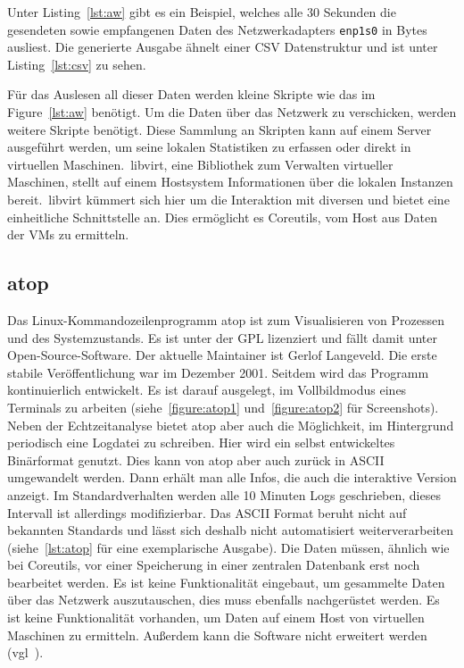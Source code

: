 Unter Listing~\ref{lst:aw} gibt es ein Beispiel, welches alle 30 Sekunden die
gesendeten sowie empfangenen Daten des Netzwerkadapters \texttt{enp1s0} in
Bytes ausliest. Die generierte Ausgabe ähnelt einer \gls{CSV} Datenstruktur und
ist unter Listing~\ref{lst:csv} zu sehen.

Für das Auslesen all dieser Daten werden kleine Skripte wie das im
Figure~\ref{lst:aw} benötigt. Um die Daten über das Netzwerk zu verschicken,
werden weitere Skripte benötigt. Diese Sammlung an Skripten kann auf einem
Server ausgeführt werden, um seine lokalen Statistiken zu erfassen oder direkt
in virtuellen Maschinen.\ libvirt, eine Bibliothek zum Verwalten virtueller
Maschinen, stellt auf einem Hostsystem Informationen über die lokalen Instanzen
bereit.\ libvirt kümmert sich hier um die Interaktion mit
diversen  und bietet eine einheitliche
Schnittstelle an. Dies ermöglicht es Coreutils, vom Host aus Daten der VMs zu
ermitteln.
\tm%

\subsection{atop}
Das Linux\hyp{}Kommandozeilenprogramm atop ist zum Visualisieren von Prozessen
und des Systemzustands. Es ist unter der GPL lizenziert und fällt damit unter
Open\hyp{}Source\hyp{}Software. Der aktuelle \gls{Maintainer} ist Gerlof
Langeveld. Die erste stabile Veröffentlichung war im Dezember 2001. Seitdem
wird das Programm kontinuierlich entwickelt. Es ist darauf ausgelegt, im
Vollbildmodus eines Terminals zu arbeiten (siehe~\ref{figure:atop1}
und~\ref{figure:atop2} für Screenshots). Neben der Echtzeitanalyse bietet atop
aber auch die Möglichkeit, im Hintergrund periodisch eine Logdatei zu
schreiben. Hier wird ein selbst entwickeltes Binärformat genutzt. Dies kann von
atop aber auch zurück in ASCII umgewandelt werden. Dann erhält man alle Infos,
die auch die interaktive Version anzeigt. Im Standardverhalten werden alle 10
Minuten Logs geschrieben, dieses Intervall ist allerdings modifizierbar. Das
ASCII Format beruht nicht auf bekannten Standards und lässt sich deshalb nicht
automatisiert weiterverarbeiten (siehe~\ref{lst:atop} für eine exemplarische
Ausgabe). Die Daten müssen, ähnlich wie bei Coreutils, vor einer Speicherung in
einer zentralen Datenbank erst noch bearbeitet werden. Es ist keine
Funktionalität eingebaut, um gesammelte Daten über das Netzwerk auszutauschen,
dies muss ebenfalls nachgerüstet werden. Es ist keine Funktionalität vorhanden,
um Daten auf einem Host von virtuellen Maschinen zu ermitteln. Außerdem kann
die Software nicht erweitert werden (vgl~\cite{atop}).
\tm%

